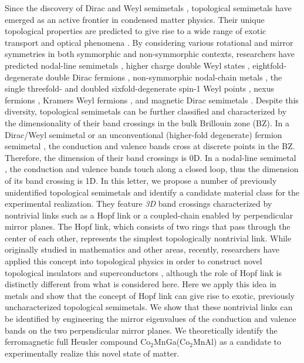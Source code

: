\documentclass[aps,prl,superscriptaddress,twocolumn,showpacs]{revtex4-1}
\begin{document}
Since the discovery of Dirac and Weyl semimetals \cite{Weyl, Herring, Volovik2003, Murakami2007, Wan2011, Burkov2011, Hsin_RMP, Na3Bi, Na3Bi_3, Na3Bi_2, Cd3As2_2, Cd3As2_3, Cd3As2_4, Huang2015, Weng2015, Hasan_TaAs, TaAs_Ding, MIT_Weyl,Rev1, Rev2}, topological semimetals have emerged as an active frontier in condensed matter physics. Their unique topological properties are predicted to give rise to a wide range of exotic transport and optical phenomena \cite{Hasan2010, Qi2011, nielsen1983adler, Nonlocal, Fermi arc_1, Fermi arc_2, Inti, PC_Weyl_Tanaka, PC_Weyl_Nagaosa, PC_Weyl_Chris, PC_Weyl_Moore, Moore2, Weyl_Floquet, Burkov, Hosur, Pallab, Pesin}. By considering various rotational and mirror symmetries in both symmorphic and non-symmorphic contexts, researchers have predicted nodal-line semimetals \cite{Burkov_NL}, higher charge double Weyl states \cite{Chen, SrSi2}, eightfold-degenerate double Dirac fermions \cite{Double Dirac}, non-symmorphic nodal-chain metals \cite{Chain}, the single threefold- and doubled sixfold-degenerate spin-1 Weyl points \cite{New Fermion}, nexus fermions \cite{Nexus, trip1, trip2}, Kramers Weyl fermions \cite{Kramers Weyl}, and magnetic Dirac semimetals \cite{AFM, AFM_2, AFM_3}. Despite this diversity, topological semimetals can be further classified and characterized by the dimensionality of their band crossings in the bulk Brillouin zone (BZ). In a Dirac/Weyl semimetal or an unconventional (higher-fold degenerate) fermion semimetal \cite{Nexus, trip1, trip2, Double Dirac, New Fermion}, the conduction and valence bands cross at discrete points in the BZ. Therefore, the dimension of their band crossings is 0D. In a nodal-line semimetal \cite{Burkov_NL}, the conduction and valence bands touch along a closed loop, thus the dimension of its band crossing is 1D. In this letter, we propose a number of previously unidentified topological semimetals and identify a candidate material class for the experimental realization. They feature \textit{3D} band crossings characterized by nontrivial links such as a Hopf link or a coupled-chain enabled by perpendicular mirror planes. The Hopf link, which consists of two rings that pass through the center of each other, represents the simplest topologically nontrivial link. While originally studied in mathematics and other areas, recently, researchers have applied this concept into topological physics in order to construct novel topological insulators and superconductors \cite{Hopf_in1, Hopf_in2, Hopf_in3}, although the role of Hopf link is distinctly different from what is considered here. Here we apply this idea in metals and show that the concept of Hopf link can give rise to exotic, previously uncharacterized topological semimetals. We show that these nontrivial links can be identified by engineering the mirror eigenvalues of the conduction and valence bands on the two perpendicular mirror planes. We theoretically identify the ferromagnetic full Heusler compound Co$_2$MnGa(Co$_2$MnAl) as a candidate to experimentally realize this novel state of matter.
\end{document}
